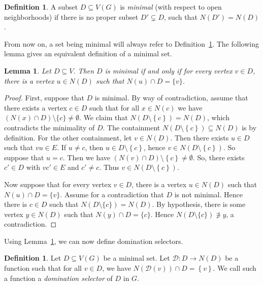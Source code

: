 \documentclass[12pt, reqno]{amsart}
\theoremstyle{definition}
\theoremstyle{plain}
\newtheorem{lemma}[theorem]{Lemma}
\theoremstyle{definition}
\newtheorem{definition}[theorem]{Definition}
\newcommand\set[1]{\left\lbrace #1 \right\rbrace}
\begin{document}
\begin{definition}\label{def. minimal}
A subset $D \subseteq V(G)$ is \emph{minimal} (with respect to open neighborhoods) if there is no proper subset $D' \subsetneq D$, such that $N(D') = N(D)$.
\end{definition}

From now on, a set being minimal will always refer to Definition~\ref{def. minimal}.
The following lemma gives an equivalent definition of a minimal set.

\begin{lemma}
\label{lem. minimalEquiv}
Let $D \subseteq V$. Then $D$ is minimal if and only if for every vertex $v \in D$, there is a vertex $u \in N(D)$ such that  $N(u) \cap D = \{v\}$.
\end{lemma}

\begin{proof}
First, suppose that $D$ is minimal.
By way of contradiction, assume that there exists a vertex $c \in D$ such that for all $x \in N(c)$ we have $(N(x) \cap D) \setminus \{c\} \neq \emptyset$.
We claim that $N(D\setminus \set{c}) = N(D)$, which contradicts the minimality of $D$.
The containment $N(D\setminus \set{c}) \subseteq N(D)$ is by definition. 
For the other containment, let $v \in N(D)$.
Then there exists $u \in D$ such that $vu \in E$.
If $u \neq c$, then $u \in D\setminus \set{c}$, hence $v \in N(D \setminus \set{c})$.
So suppose that $u = c$.
Then we have $(N(v) \cap D)\setminus \set{c} \neq \emptyset$.
So, there exists $c' \in D$ with $vc' \in E$ and $c' \neq c$.
Thus $v \in N(D \setminus \set{c})$.

Now suppose that for every vertex $v \in D$, there is a vertex $u \in N(D)$ such that $N(u) \cap D = \{v\}$.
Assume for a contradiction that $D$ is not minimal.
Hence there is $c \in D$ such that $N(D \setminus \{c\}) = N(D)$.
By hypothesis, there is some vertex $y \in N(D)$ such that $N(y) \cap D = \{c\}$.
Hence $N(D\setminus \{c\}) \not\ni y$, a contradiction.
\end{proof}

Using Lemma~\ref{lem. minimalEquiv}, we can now define domination selectors.

\begin{definition}\label{def. dom. selector}
Let $D \subseteq V(G)$ be a minimal set. 
Let $\mathcal{D}:D\to N(D)$ be a function such that for all $v \in D$, we have
$N(\mathcal{D}(v)) \cap D = \set{v}$.
We call such a function a \emph{domination selector} of $D$ in $G$.
\end{definition} 
\end{document}
